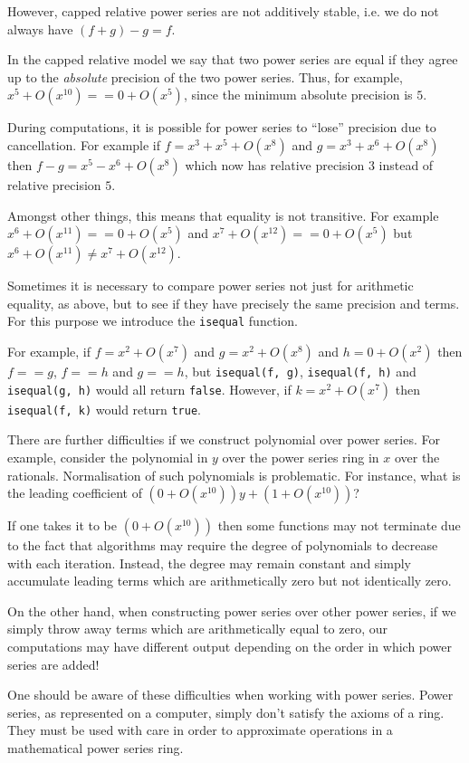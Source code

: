\documentclass[a4paper,10pt]{article}
\newcommand{\code}{\lstinline}
\begin{document}
However, capped relative power series are not additively stable, i.e. we
do not always have $(f + g) - g = f$.

In the capped relative model we say that two power series are equal if they
agree up to the \emph{absolute} precision of the two power series. Thus, for
example, $x^5 + O(x^10) == 0 + O(x^5)$, since the minimum absolute precision
is $5$.

During computations, it is possible for power series to ``lose'' precision
due to cancellation. For example if $f = x^3 + x^5 + O(x^8)$ and
$g = x^3 + x^6 + O(x^8)$ then $f - g = x^5 - x^6 + O(x^8)$ which now has
relative precision $3$ instead of relative precision $5$.

Amongst other things, this means that equality is not transitive. For example
$x^6 + O(x^11) == 0 + O(x^5)$ and $x^7 + O(x^12) == 0 + O(x^5)$ but
$x^6 + O(x^11) \neq x^7 + O(x^12)$.

Sometimes it is necessary to compare power series not just for arithmetic
equality, as above, but to see if they have precisely the same precision and
terms. For this purpose we introduce the \code{isequal} function.

For example, if $f = x^2 + O(x^7)$ and $g = x^2 + O(x^8)$ and $h = 0 + O(x^2)$
then $f == g$, $f == h$ and $g == h$, but \code{isequal(f, g)},
\code{isequal(f, h)} and \code{isequal(g, h)} would all return \code{false}.
However, if $k = x^2 + O(x^7)$ then \code{isequal(f, k)} would return
\code{true}.

There are further difficulties if we construct polynomial over power series.
For example, consider the polynomial in $y$ over the power series ring in $x$
over the rationals. Normalisation of such polynomials is problematic. For
instance, what is the leading coefficient of $(0 + O(x^10))y + (1 + O(x^10))$?

If one takes it to be $(0 + O(x^10))$ then some functions may not terminate
due to the fact that algorithms may require the degree of polynomials to
decrease with each iteration. Instead, the degree may remain constant and
simply accumulate leading terms which are arithmetically zero but not
identically zero.

On the other hand, when constructing power series over other power series, if
we simply throw away terms which are arithmetically equal to zero, our
computations may have different output depending on the order in which
power series are added!

One should be aware of these difficulties when working with power series.
Power series, as represented on a computer, simply don't satisfy the axioms
of a ring. They must be used with care in order to approximate operations in
a mathematical power series ring.
\end{document}
